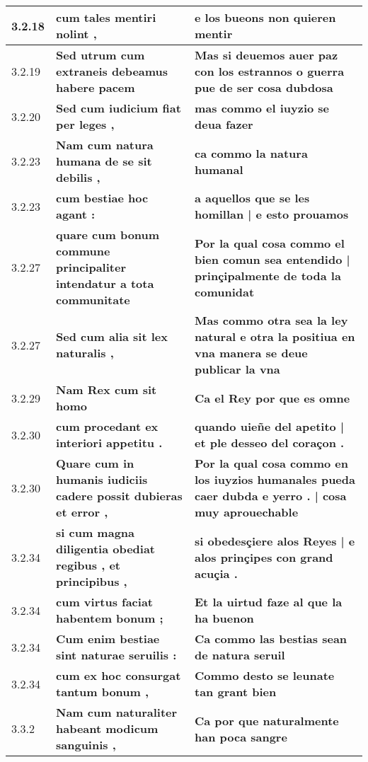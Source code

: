\begin{tabular}{|p{1cm}|p{6.5cm}|p{6.5cm}|}
3.2.18 &  \textbf{ cum tales mentiri nolint , }  &  \textbf{ e los bueons non quieren mentir }  \\\hline
3.2.19 &  \textbf{ Sed utrum cum extraneis debeamus habere pacem }  &  \textbf{ Mas si deuemos auer paz con los estrannos o guerra pue de ser cosa dubdosa }  \\\hline
3.2.20 &  \textbf{ Sed cum iudicium fiat per leges , }  &  \textbf{ mas commo el iuyzio se deua fazer }  \\\hline
3.2.23 &  \textbf{ Nam cum natura humana de se sit debilis , }  &  \textbf{ ca commo la natura humanal }  \\\hline
3.2.23 &  \textbf{ cum bestiae hoc agant : }  &  \textbf{ a aquellos que se les homillan | e esto prouamos }  \\\hline
3.2.27 &  \textbf{ quare cum bonum commune principaliter intendatur a tota communitate }  &  \textbf{ Por la qual cosa commo el bien comun sea entendido | prinçipalmente de toda la comunidat }  \\\hline
3.2.27 &  \textbf{ Sed cum alia sit lex naturalis , }  &  \textbf{ Mas commo otra sea la ley natural e otra la positiua en vna manera se deue publicar la vna }  \\\hline
3.2.29 &  \textbf{ Nam Rex cum sit homo }  &  \textbf{ Ca el Rey por que es omne }  \\\hline
3.2.30 &  \textbf{ cum procedant ex interiori appetitu . }  &  \textbf{ quando uieñe del apetito | et ple desseo del coraçon . }  \\\hline
3.2.30 &  \textbf{ Quare cum in humanis iudiciis cadere possit dubieras et error , }  &  \textbf{ Por la qual cosa commo en los iuyzios humanales pueda caer dubda e yerro . | cosa muy aprouechable }  \\\hline
3.2.34 &  \textbf{ si cum magna diligentia obediat regibus , et principibus , }  &  \textbf{ si obedesçiere alos Reyes | e alos prinçipes con grand acuçia . }  \\\hline
3.2.34 &  \textbf{ cum virtus faciat habentem bonum ; }  &  \textbf{ Et la uirtud faze al que la ha buenon }  \\\hline
3.2.34 &  \textbf{ Cum enim bestiae sint naturae seruilis : }  &  \textbf{ Ca commo las bestias sean de natura seruil }  \\\hline
3.2.34 &  \textbf{ cum ex hoc consurgat tantum bonum , }  &  \textbf{ Commo desto se leunate tan grant bien }  \\\hline
3.3.2 &  \textbf{ Nam cum naturaliter habeant modicum sanguinis , }  &  \textbf{ Ca por que naturalmente han poca sangre }  \\\hline

\end{tabular}
